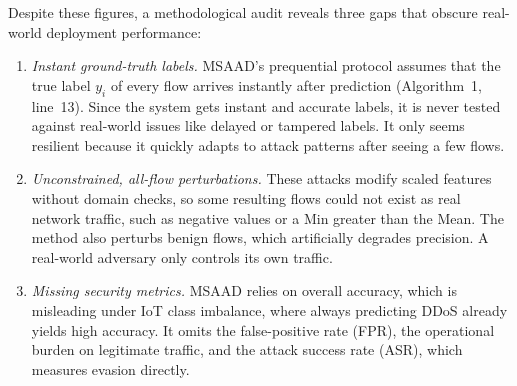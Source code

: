 \documentclass[conference]{IEEEtran}
\begin{document}
Despite these figures, a methodological audit reveals three gaps that obscure
real-world deployment performance:
\begin{enumerate}
\item \textit{Instant ground-truth labels.} MSAAD's prequential protocol
assumes that the true label $y_i$ of every flow arrives instantly after
prediction (Algorithm~1, line~13). Since the system gets instant and accurate
labels, it is never tested against real-world issues like delayed or tampered
labels. It only seems resilient because it quickly adapts to attack patterns
after seeing a few flows.
\item \textit{Unconstrained, all-flow perturbations.} These attacks modify
scaled features without domain checks, so some resulting flows could not exist
as real network traffic, such as negative values or a Min greater than the
Mean. The method also perturbs benign flows, which artificially degrades
precision. A real-world adversary only controls its own traffic.
\item \textit{Missing security metrics.} MSAAD relies on overall accuracy,
which is misleading under IoT class imbalance, where always predicting DDoS
already yields high accuracy. It omits the false-positive rate (FPR), the
operational burden on legitimate traffic, and the attack success rate (ASR),
which measures evasion directly.
\end{enumerate}
\end{document}

